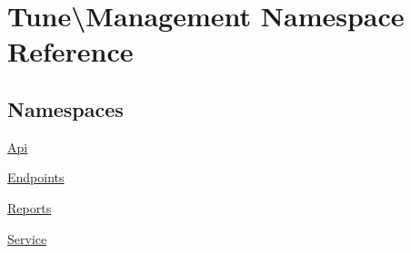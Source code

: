 \hypertarget{namespaceTune_1_1Management}{\section{Tune\textbackslash{}Management Namespace Reference}
\label{namespaceTune_1_1Management}
}
\subsection*{Namespaces}
\begin{DoxyCompactItemize}
\item 
\hyperlink{namespaceTune_1_1Management_1_1Api}{Api}
\item 
\hyperlink{namespaceTune_1_1Management_1_1Endpoints}{Endpoints}
\item 
\hyperlink{namespaceTune_1_1Management_1_1Reports}{Reports}
\item 
\hyperlink{namespaceTune_1_1Management_1_1Service}{Service}
\end{DoxyCompactItemize}
